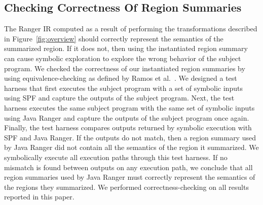 \subsection{Checking Correctness Of Region Summaries}
The Ranger IR computed as a result of performing the transformations described in Figure~\ref{fig:overview} should
correctly represent the semantics of the summarized region.
%
If it does not, then using the instantiated region summary can cause symbolic exploration to explore the wrong behavior
of the subject program.
%
We checked the correctness of our instantiated region summaries by using equivalence-checking as defined by Ramos et al.~\cite{ramos}.
%
We designed a test harness that first executes the subject program with a set of symbolic inputs using SPF and
capture the outputs of the subject program.
%
Next, the test harness executes the same subject program with the same set of symbolic inputs using Java Ranger and
capture the outputs of the subject program once again.
%
Finally, the test harness compares outputs returned by symbolic execution with SPF and Java Ranger.
%
If the outputs do not match, then a region summary used by Java Ranger did not contain all the semantics
of the region it summarized.
%
We symbolically execute all execution paths through this test harness.
%
If no mismatch is found between outputs on any execution path, we conclude that all region summaries used by Java Ranger
must correctly represent the semantics of the regions they summarized.
%
We performed correctness-checking on all results reported in this paper.
